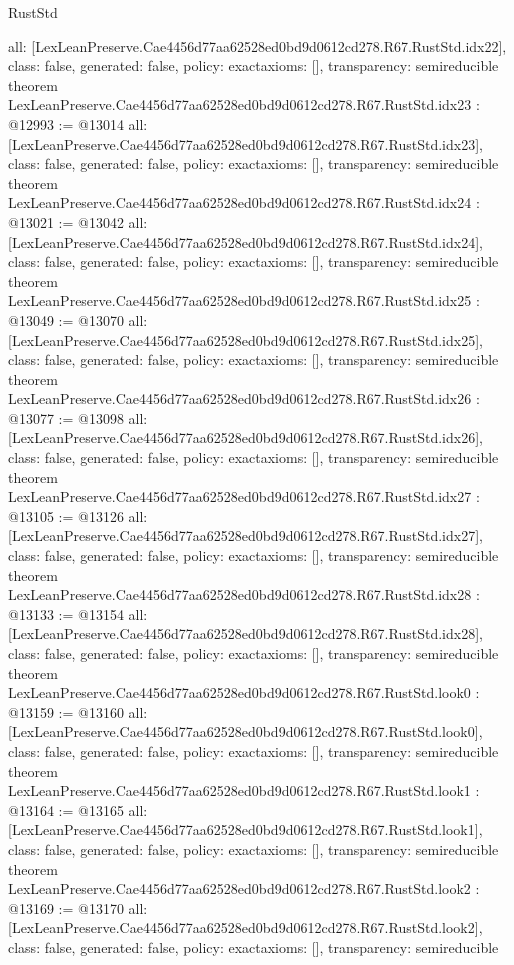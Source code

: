 \begin{lexlean}{RustStd}
\begin{coremodule}
{  all: [LexLeanPreserve.Cae4456d77aa62528ed0bd9d0612cd278.R67.RustStd.idx22],
  class: false,
  generated: false,
  policy: exact{axioms: []},
  transparency: semireducible
}
theorem LexLeanPreserve.Cae4456d77aa62528ed0bd9d0612cd278.R67.RustStd.idx23 : @12993 := @13014 {
  all: [LexLeanPreserve.Cae4456d77aa62528ed0bd9d0612cd278.R67.RustStd.idx23],
  class: false,
  generated: false,
  policy: exact{axioms: []},
  transparency: semireducible
}
theorem LexLeanPreserve.Cae4456d77aa62528ed0bd9d0612cd278.R67.RustStd.idx24 : @13021 := @13042 {
  all: [LexLeanPreserve.Cae4456d77aa62528ed0bd9d0612cd278.R67.RustStd.idx24],
  class: false,
  generated: false,
  policy: exact{axioms: []},
  transparency: semireducible
}
theorem LexLeanPreserve.Cae4456d77aa62528ed0bd9d0612cd278.R67.RustStd.idx25 : @13049 := @13070 {
  all: [LexLeanPreserve.Cae4456d77aa62528ed0bd9d0612cd278.R67.RustStd.idx25],
  class: false,
  generated: false,
  policy: exact{axioms: []},
  transparency: semireducible
}
theorem LexLeanPreserve.Cae4456d77aa62528ed0bd9d0612cd278.R67.RustStd.idx26 : @13077 := @13098 {
  all: [LexLeanPreserve.Cae4456d77aa62528ed0bd9d0612cd278.R67.RustStd.idx26],
  class: false,
  generated: false,
  policy: exact{axioms: []},
  transparency: semireducible
}
theorem LexLeanPreserve.Cae4456d77aa62528ed0bd9d0612cd278.R67.RustStd.idx27 : @13105 := @13126 {
  all: [LexLeanPreserve.Cae4456d77aa62528ed0bd9d0612cd278.R67.RustStd.idx27],
  class: false,
  generated: false,
  policy: exact{axioms: []},
  transparency: semireducible
}
theorem LexLeanPreserve.Cae4456d77aa62528ed0bd9d0612cd278.R67.RustStd.idx28 : @13133 := @13154 {
  all: [LexLeanPreserve.Cae4456d77aa62528ed0bd9d0612cd278.R67.RustStd.idx28],
  class: false,
  generated: false,
  policy: exact{axioms: []},
  transparency: semireducible
}
theorem LexLeanPreserve.Cae4456d77aa62528ed0bd9d0612cd278.R67.RustStd.look0 : @13159 := @13160 {
  all: [LexLeanPreserve.Cae4456d77aa62528ed0bd9d0612cd278.R67.RustStd.look0],
  class: false,
  generated: false,
  policy: exact{axioms: []},
  transparency: semireducible
}
theorem LexLeanPreserve.Cae4456d77aa62528ed0bd9d0612cd278.R67.RustStd.look1 : @13164 := @13165 {
  all: [LexLeanPreserve.Cae4456d77aa62528ed0bd9d0612cd278.R67.RustStd.look1],
  class: false,
  generated: false,
  policy: exact{axioms: []},
  transparency: semireducible
}
theorem LexLeanPreserve.Cae4456d77aa62528ed0bd9d0612cd278.R67.RustStd.look2 : @13169 := @13170 {
  all: [LexLeanPreserve.Cae4456d77aa62528ed0bd9d0612cd278.R67.RustStd.look2],
  class: false,
  generated: false,
  policy: exact{axioms: []},
  transparency: semireducible
}
\end{coremodule}
\end{lexlean}
